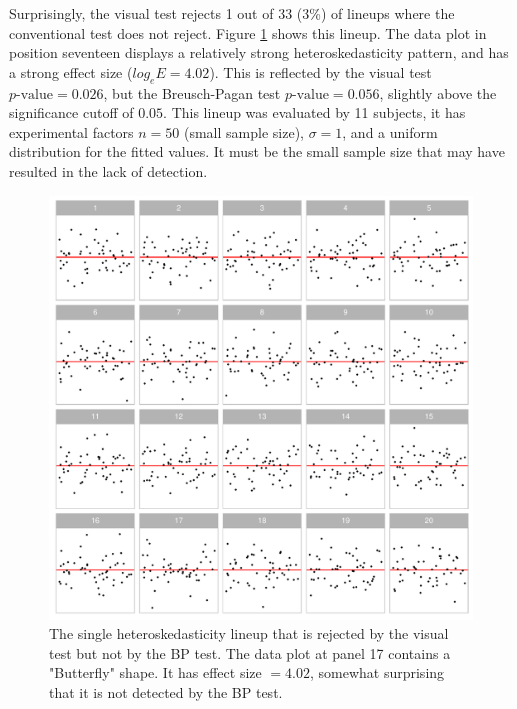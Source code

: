\documentclass[]{interact}
\theoremstyle{plain}%
\theoremstyle{definition}
\theoremstyle{remark}
\begin{document}
Surprisingly, the visual test rejects 1 out of 33 (3\%) of lineups where
the conventional test does not reject. Figure \ref{fig:heter-example}
shows this lineup. The data plot in position seventeen displays a
relatively strong heteroskedasticity pattern, and has a strong effect
size (\(log_e E=4.02\)). This is reflected by the visual test
\(p\text{-value} = 0.026\), but the Breusch-Pagan test
\(p\text{-value} = 0.056\), slightly above the significance cutoff of
\(0.05\). This lineup was evaluated by 11 subjects, it has experimental
factors \(n=50\) (small sample size), \(\sigma=1\), and a uniform
distribution for the fitted values. It must be the small sample size
that may have resulted in the lack of detection.

\begin{figure}

{\centering \includegraphics[width=1\linewidth]{paper_comparison_files/figure-latex/heter-example-1} 

}

\caption{The single heteroskedasticity lineup that is rejected by the visual test but not by the BP test. The data plot at panel 17 contains a "Butterfly" shape. It has effect size $ = 4.02$, somewhat surprising that it is not detected by the BP test.}\label{fig:heter-example}
\end{figure}
\end{document}
